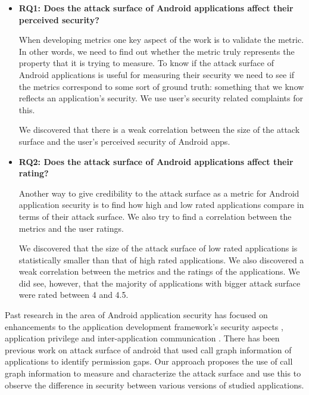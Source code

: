 \documentclass{sig-alternate}
\begin{document}
\begin{itemize}
  
\item \textbf{RQ1: Does the attack surface of Android applications affect their perceived security?} 

When developing metrics one key aspect of the work is to validate the metric. In other words, we need to find out whether the metric truly represents the property that it is trying to measure. To know if the attack surface of Android applications is useful for measuring their security we need to see if the metrics correspond to some sort of ground truth: something that we know reflects an application's security. We use user's security related complaints for this.

We discovered that there is a weak correlation between the size of the attack surface and the user's perceived security of Android apps. 

\item \textbf{RQ2: Does the attack surface of Android applications affect their rating?}

Another way to give credibility to the attack surface as a metric for Android application security is to find how high and low rated applications compare in terms of their attack surface. We also try to find a correlation between the metrics and the user ratings.

We discovered that the size of the attack surface of low rated applications is statistically smaller than that of high rated applications. We also discovered a weak correlation between the metrics and the ratings of the applications. We did see, however, that the majority of applications with bigger attack surface were rated between 4 and 4.5.

\end{itemize}

Past research in the area of Android application security has focused on enhancements to the application development framework's security aspects \cite{ongtang_semantically_2012}, application privilege \cite{bugiel2012towards} and inter-application communication \cite{chin_analyzing_2011}. There has been previous work on attack surface of android \cite{bartel_automatically_2012} that used call graph information of applications to identify permission gaps. Our approach proposes the use of call graph information to measure and characterize the attack surface and use this to observe the difference in security between various versions of studied applications.
\end{document}
